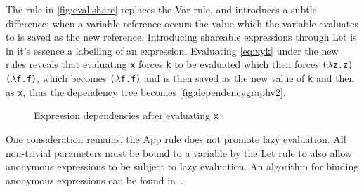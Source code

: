 \begin{figure}[ht]
  \begin{mdframed}
    \begin{prooftree}
    \end{prooftree}
  \end{mdframed}
  \caption{}
  \label{fig:eval:share}
\end{figure}
The rule in \autoref{fig:eval:share} replaces the Var rule, and introduces a subtle difference; when a variable reference occurs the value which the variable evaluates to is saved as the new reference.
Introducing shareable expressions through Let is in it's essence a labelling of an expression.
Evaluating \autoref{eq:xyk} under the new rules reveals that evaluating \texttt{x} forces \texttt{k} to be evaluated which then forces \texttt{($\lambda$z.z) ($\lambda$f.f)}, which becomes \texttt{($\lambda$f.f)} and is then saved as the new value of \texttt{k} and then as \texttt{x}, thus the dependency tree becomes \autoref{fig:dependencygraphv2}.
\begin{figure}[ht]
  \centering
  \caption{Expression dependencies after evaluating \texttt{x}}
  \label{fig:dependencygraphv2}
\end{figure}
One consideration remains, the App rule does not promote lazy evaluation.
All non-trivial parameters must be bound to a variable by the Let rule to also allow anonymous expressions to be subject to lazy evaluation.
An algorithm for binding anonymous expressions can be found in~\cite{launchbury1993natural}.

